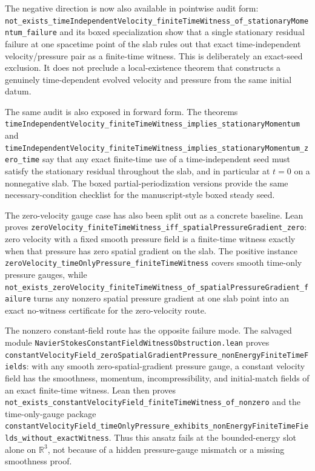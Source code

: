 \documentclass[11pt]{article}
\theoremstyle{remark}
\begin{document}
The negative direction is now also available in pointwise audit form:
\texttt{not\_exists\_timeIndependentVelocity\_finiteTimeWitness\_of\_stationaryMomentum\_failure}
and its boxed specialization show that a single stationary residual failure at
one spacetime point of the slab rules out that exact time-independent
velocity/pressure pair as a finite-time witness.  This is deliberately an
exact-seed exclusion.  It does not preclude a local-existence theorem that
constructs a genuinely time-dependent evolved velocity and pressure from the
same initial datum.

The same audit is also exposed in forward form.  The theorems
\texttt{timeIndependentVelocity\_finiteTimeWitness\_implies\_stationaryMomentum}
and
\texttt{timeIndependentVelocity\_finiteTimeWitness\_implies\_stationaryMomentum\_zero\_time}
say that any exact finite-time use of a time-independent seed must satisfy the
stationary residual throughout the slab, and in particular at \(t=0\) on a
nonnegative slab.  The boxed partial-periodization versions provide the same
necessary-condition checklist for the manuscript-style boxed steady seed.

The zero-velocity gauge case has also been split out as a concrete baseline.
Lean proves
\texttt{zeroVelocity\_finiteTimeWitness\_iff\_spatialPressureGradient\_zero}:
zero velocity with a fixed smooth pressure field is a finite-time witness
exactly when that pressure has zero spatial gradient on the slab.  The positive
instance
\texttt{zeroVelocity\_timeOnlyPressure\_finiteTimeWitness} covers smooth
time-only pressure gauges, while
\texttt{not\_exists\_zeroVelocity\_finiteTimeWitness\_of\_spatialPressureGradient\_failure}
turns any nonzero spatial pressure gradient at one slab point into an exact
no-witness certificate for the zero-velocity route.

The nonzero constant-field route has the opposite failure mode.  The salvaged
module \texttt{NavierStokesConstantFieldWitnessObstruction.lean} proves
\texttt{constantVelocityField\_zeroSpatialGradientPressure\_nonEnergyFiniteTimeFields}:
with any smooth zero-spatial-gradient pressure gauge, a constant velocity field
has the smoothness, momentum, incompressibility, and initial-match fields of an
exact finite-time witness.  Lean then proves
\texttt{not\_exists\_constantVelocityField\_finiteTimeWitness\_of\_nonzero} and
the time-only-gauge package
\texttt{constantVelocityField\_timeOnlyPressure\_exhibits\_nonEnergyFiniteTimeFields\_without\_exactWitness}.
Thus this ansatz fails at the bounded-energy slot alone on \(\mathbb{R}^3\),
not because of a hidden pressure-gauge mismatch or a missing smoothness proof.
\end{document}
